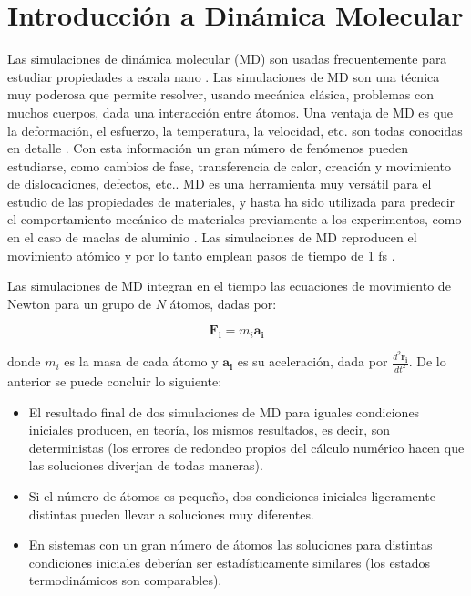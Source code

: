 
\section{Introducción a Dinámica Molecular}
\label{S2_2}

Las simulaciones de dinámica molecular (MD) son usadas frecuentemente para estudiar propiedades a escala nano \citep{allen87}. Las simulaciones de MD son una técnica muy poderosa que permite resolver, usando mecánica clásica, problemas con muchos cuerpos, dada una interacción entre átomos. Una ventaja de MD es que la deformación, el esfuerzo, la temperatura, la velocidad, etc. son todas conocidas en detalle \citep{allen87}. Con esta información un gran número de fenómenos pueden estudiarse, como cambios de fase, transferencia de calor, creación y movimiento de dislocaciones, defectos, etc.. MD es una herramienta muy versátil para el estudio de las propiedades de materiales, y hasta ha sido utilizada para predecir el comportamiento mecánico de materiales previamente a los experimentos, como en el caso de maclas de aluminio \citep{chen03}. Las simulaciones de MD reproducen el movimiento atómico y por lo tanto emplean pasos de tiempo de 1 fs \citep{allen87}.

Las simulaciones de MD integran en el tiempo las ecuaciones de movimiento de Newton para un grupo de $N$ átomos, dadas por:

\begin{equation}
\mathbf{F_{i}} = m_{i}\mathbf{a_{i}}
\end{equation}

donde $m_{i}$ es la masa de cada átomo y $\mathbf{a_{i}}$ es su aceleración, dada por $\frac{d^{2}\mathbf{r_{i}}}{dt^{2}}$. De lo anterior se puede concluir lo siguiente:

\begin{itemize}
 \item El resultado final de dos simulaciones de MD para iguales condiciones iniciales producen, en teoría, los mismos resultados, es decir, son deterministas (los errores de redondeo propios del cálculo numérico hacen que las soluciones diverjan de todas maneras).
 \item Si el número de átomos es pequeño, dos condiciones iniciales ligeramente distintas pueden llevar a soluciones muy diferentes.
 \item En sistemas con un gran número de átomos las soluciones para distintas condiciones iniciales deberían ser estadísticamente similares (los estados termodinámicos son comparables).
\end{itemize}

